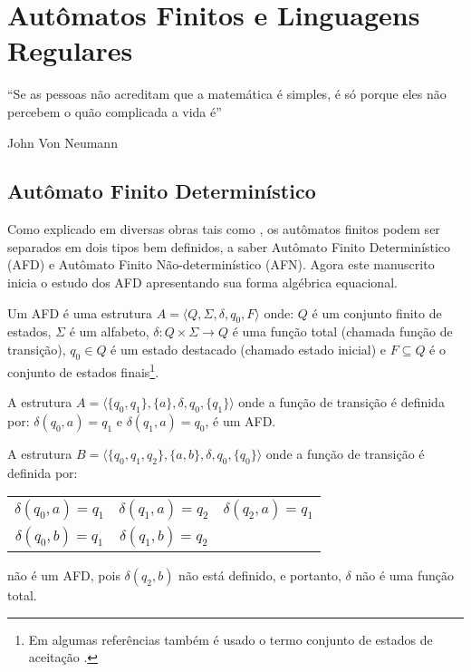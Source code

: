 \chapter{Autômatos Finitos e Linguagens Regulares}\label{cap:LinguagemRegulares}

\epigraph{``Se as pessoas não acreditam que a matemática é simples, é só porque eles não percebem o quão complicada a vida é''}{John Von Neumann}

\section{Autômato Finito Determinístico}\label{sec:AFD}

Como explicado em diversas obras tais como \cite{benjaLivro2010, hopcroft2008, linz2006, menezes1998LFA}, os autômatos finitos podem ser separados em dois tipos bem definidos, a saber Autômato Finito Determinístico (AFD) e Autômato Finito Não-determinístico (AFN). Agora este manuscrito inicia o estudo dos AFD apresentando sua forma algébrica equacional.

\begin{definition}\label{def:AFD}
	Um AFD é uma estrutura $A = \langle Q, \Sigma, \delta, q_0, F\rangle$ onde: $Q$ é um conjunto finito de estados, $\Sigma$ é um alfabeto, $\delta : Q \times \Sigma \rightarrow Q$ é uma função total (chamada função de transição), $q_0 \in Q$ é um estado destacado (chamado estado inicial) e $F \subseteq Q$ é o conjunto de estados finais\footnote{Em algumas referências também é usado o termo conjunto de estados de aceitação \cite{de2010}.}.
\end{definition}

\begin{example}\label{exe:AFD}
	A estrutura $A = \langle \{q_0, q_1\}, \{a\}, \delta, q_0, \{q_1\} \rangle$ onde a função de transição é definida por: $\delta(q_0, a) = q_1$ e $\delta(q_1, a) = q_0$, é um AFD.
\end{example}

\begin{example}\label{exe:NaoEAFD}
	A estrutura $B = \langle \{q_0, q_1, q_2\}, \{a, b\}, \delta, q_0, \{q_0\} \rangle$ onde a função de transição é definida por:
	\begin{table*}[h]
		\centering
		\begin{tabular}{ccc}
			$\delta(q_0, a) = q_1$ & $\delta(q_1, a) = q_2$ & $\delta(q_2, a) = q_1$\\
			$\delta(q_0, b) = q_1$ & $\delta(q_1, b) = q_2$ & 
		\end{tabular}
	\end{table*}
	
	\noindent não é um AFD, pois $\delta(q_2, b)$ não está definido, e portanto, $\delta$ não é uma função total.
\end{example}

